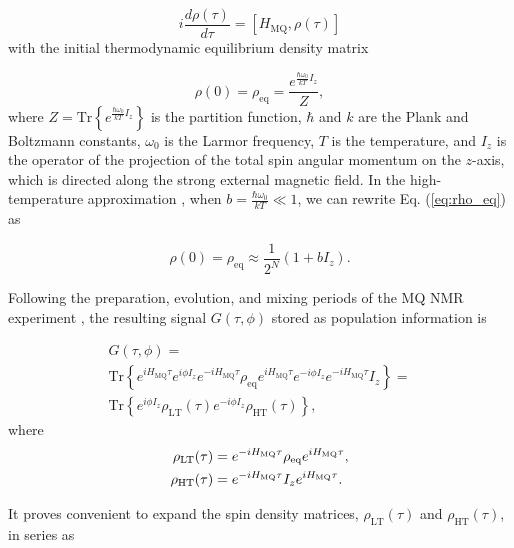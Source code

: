 \documentclass[
    pra,  
    twocolumn, 
    floatfix, 
    amsmath, 
    amssymb, 
    superscriptaddress
]{revtex4-1}
\begin{document}
\begin{equation}
    \label{eq:liouvile}
    i \dfrac{d\rho(\tau)}{d \tau} = 
    \left[H_\mathrm{MQ}, \rho(\tau)\right]
\end{equation}
with the initial thermodynamic equilibrium density matrix

\begin{equation}
    \label{eq:rho_eq}
    \rho(0) = \rho_{\mathrm{eq}} = 
    \dfrac{e^{\frac{\hbar\omega_{0}}{kT} I_z}}{Z},
\end{equation}
where $Z =\mathrm{Tr}\left\{e^{\frac{\hbar\omega_{0}}{kT} I_z}\right\}$ is the partition function, $\hbar$ and $k$ are the Plank and Boltzmann constants, $\omega_0$ is the Larmor frequency, $T$ is the temperature, and $I_z$ is the operator of the projection of the total spin angular momentum on the $z$-axis, which is directed along the strong external magnetic field. In the high-temperature approximation \cite{Goldman}, when $b = \frac{\hbar\omega_{0}}{kT} \ll 1$, we can rewrite Eq.   (\ref{eq:rho_eq}) as 

\begin{equation}
    \label{eq:rho_ht}
    \rho(0) = \rho_{\mathrm{eq}} \approx
    \dfrac{1}{2^N} (1 + bI_z).
\end{equation}

Following the preparation, evolution, and mixing periods of the MQ NMR experiment \cite{mq_nmr_experiment}, the resulting signal $G(\tau, \phi)$ stored as population information is \cite{lab:low_temp_dyn_1997}

\begin{multline}
    \label{eq:signal}
     G(\tau, \phi) = \\ 
     \mathrm{Tr}\left\{
         e^{iH_\mathrm{MQ}\tau} e^{i\phi I_z} e^{-iH_\mathrm{MQ}\tau}
         \rho_\mathrm{eq}
         e^{iH_\mathrm{MQ}\tau} e^{-i\phi I_z} e^{-iH_\mathrm{MQ}\tau}
         I_z \right\} = \\
    \mathrm{Tr}\left\{e^{i\phi I_z} \rho_\mathrm{LT} (\tau)
              e^{-i\phi I_z} \rho_\mathrm{HT} (\tau) \right\},
\end{multline}
where
\begin{align}
    \label{eq:eval_rho}
    \rho_\mathrm{LT} (\tau) & = e^{-iH_\mathrm{MQ}\tau} \rho_\mathrm{eq} e^{iH_\mathrm{MQ}\tau},
    \notag\\
    \rho_\mathrm{HT} (\tau) & =  e^{-iH_\mathrm{MQ}\tau} I_z e^{iH_\mathrm{MQ}\tau}.
\end{align}

It proves convenient to expand the spin density matrices, $\rho_\mathrm{LT}(\tau)$ and $\rho_\mathrm{HT}(\tau)$, in series as
\end{document}
